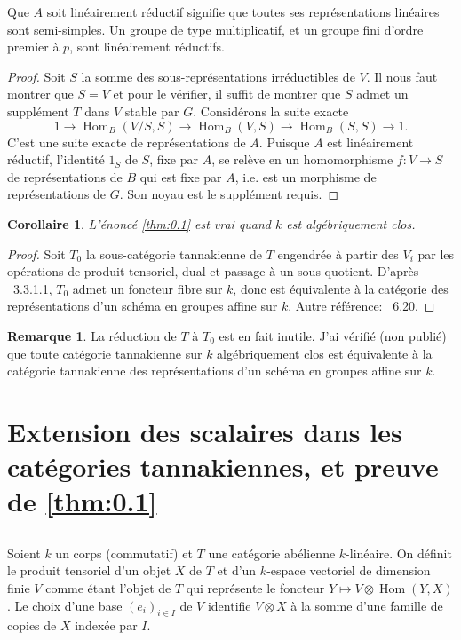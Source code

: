 \documentclass[11pt,a4paper]{article}
\theoremstyle{plain}
\newtheorem{corollary}[theorem]{Corollaire}
\theoremstyle{definition}
\newtheorem{remark}[theorem]{Remarque}
\DeclareMathOperator{\Hom}{Hom}
\begin{document}
Que $A$ soit lin\'eairement r\'eductif signifie que toutes ses repr\'esentations lin\'eaires sont semi-simples. Un groupe de type multiplicatif, et un groupe fini d'ordre premier \`a $p$, sont lin\'eairement r\'eductifs.

\begin{proof}
Soit $S$ la somme des sous-repr\'esentations irr\'eductibles de $V$. Il nous faut montrer que $S = V$ et pour le v\'erifier, il suffit de montrer que $S$ admet un suppl\'ement $T$ dans $V$ stable par $G$. Consid\'erons la suite exacte
\[
1 \longrightarrow \Hom_B(V/S, S) \longrightarrow \Hom_B(V, S) \longrightarrow \Hom_B(S, S) \longrightarrow 1.
\]
C'est une suite exacte de repr\'esentations de $A$. Puisque $A$ est lin\'eairement r\'eductif, l'identit\'e $1_S$ de $S$, fixe par $A$, se rel\`eve en un homomorphisme $f: V \to S$ de repr\'esentations de $B$ qui est fixe par $A$, i.e. est un morphisme de repr\'esentations de $G$. Son noyau est le suppl\'ement requis.
\end{proof}

\begin{corollary}\label{cor:3.3}
L'\'enonc\'e \ref{thm:0.1} est vrai quand $k$ est alg\'ebriquement clos.
\end{corollary}

\begin{proof}
Soit $T_0$ la sous-cat\'egorie tannakienne de $T$ engendr\'ee \`a partir des $V_i$ par les op\'erations de produit tensoriel, dual et passage \`a un sous-quotient. D'apr\`es \cite{Saavedra}~3.3.1.1, $T_0$ admet un foncteur fibre sur $k$, donc est \'equivalente \`a la cat\'egorie des repr\'esentations d'un sch\'ema en groupes affine sur $k$. Autre r\'ef\'erence: \cite{Deligne1990}~6.20.
\end{proof}

\begin{remark}\label{rem:3.4}
La r\'eduction de $T$ \`a $T_0$ est en fait inutile. J'ai v\'erifi\'e (non publi\'e) que toute cat\'egorie tannakienne sur $k$ alg\'ebriquement clos est \'equivalente \`a la cat\'egorie tannakienne des repr\'esentations d'un sch\'ema en groupes affine sur $k$.
\end{remark}

\section{Extension des scalaires dans les cat\'egories tannakiennes, et preuve de \ref{thm:0.1}}\label{sec:4}

\subsection{}
Soient $k$ un corps (commutatif) et $T$ une cat\'egorie ab\'elienne $k$-lin\'eaire. On d\'efinit le produit tensoriel d'un objet $X$ de $T$ et d'un $k$-espace vectoriel de dimension finie $V$ comme \'etant l'objet de $T$ qui repr\'esente le foncteur $Y \mapsto V \otimes \Hom(Y, X)$. Le choix d'une base $(e_i)_{i \in I}$ de $V$ identifie $V \otimes X$ \`a la somme d'une famille de copies de $X$ index\'ee par $I$.
\end{document}
